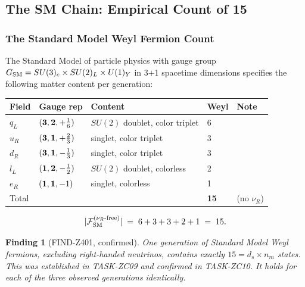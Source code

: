 \documentclass[12pt, a4paper]{article}
\newtheorem{finding}{Finding}[section]
\begin{document}
\subsection{The SM Chain: Empirical Count of 15}
\label{sec:sm-chain}

\subsubsection{The Standard Model Weyl Fermion Count}

The Standard Model of particle physics with gauge group
$G_{\rm SM} = SU(3)_c \times SU(2)_L \times U(1)_Y$ in 3+1
spacetime dimensions specifies the following matter content per
generation:

\begin{formalbox}[title={SM Weyl fermion count (EQ-TC02)}]
{\small
\renewcommand{\arraystretch}{1.30}
\begin{tabular}{p{2.2cm} p{2.8cm} p{2.5cm} p{1.5cm} p{1.5cm}}
\toprule
\textbf{Field} & \textbf{Gauge rep} & \textbf{Content} &
\textbf{Weyl} & \textbf{Note} \\
\midrule
$q_L$     & $({\bf 3}, {\bf 2}, +\tfrac{1}{6})$ & $SU(2)$ doublet, color triplet & 6 & \\
$u_R$     & $({\bf 3}, {\bf 1}, +\tfrac{2}{3})$ & singlet, color triplet           & 3 & \\
$d_R$     & $({\bf 3}, {\bf 1}, -\tfrac{1}{3})$ & singlet, color triplet           & 3 & \\
$l_L$     & $({\bf 1}, {\bf 2}, -\tfrac{1}{2})$ & $SU(2)$ doublet, colorless       & 2 & \\
$e_R$     & $({\bf 1}, {\bf 1}, -1)$            & singlet, colorless               & 1 & \\
\midrule
Total     & & & \textbf{15} & (no $\nu_R$) \\
\bottomrule
\end{tabular}
}
\begin{equation}
  |\mathcal{F}_{\rm SM}^{(\nu_R\text{-free})}|
  \;=\; 6 + 3 + 3 + 2 + 1 \;=\; 15.
  \label{eq:sm-count}
\end{equation}
\end{formalbox}

\begin{finding}[FIND-Z401, confirmed]
\label{find:z401}
One generation of Standard Model Weyl fermions, excluding right-handed
neutrinos, contains exactly $15 = d_s \times n_m$ states. This was
established in TASK-ZC09 and confirmed in TASK-ZC10. It holds for
each of the three observed generations identically.
\end{finding}
\end{document}
